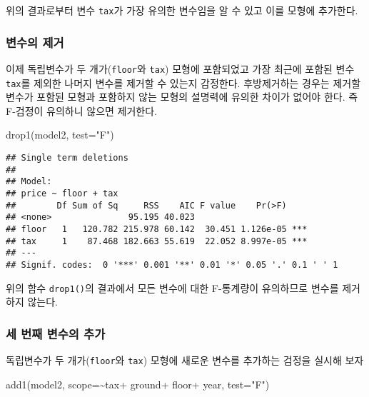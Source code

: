 \documentclass[
]{book}
\newenvironment{Shaded}{\begin{snugshade}}{\end{snugshade}}
\newcommand{\AttributeTok}[1]{\textcolor[rgb]{0.77,0.63,0.00}{#1}}
\newcommand{\FunctionTok}[1]{\textcolor[rgb]{0.00,0.00,0.00}{#1}}
\newcommand{\NormalTok}[1]{#1}
\newcommand{\SpecialCharTok}[1]{\textcolor[rgb]{0.00,0.00,0.00}{#1}}
\newcommand{\StringTok}[1]{\textcolor[rgb]{0.31,0.60,0.02}{#1}}
\begin{document}
위의 결과로부터 변수 \texttt{tax}가 가장 유의한 변수임을 알 수 있고 이를 모형에 추가한다.

\hypertarget{uxbcc0uxc218uxc758-uxc81cuxac70}{%
\subsubsection{변수의 제거}\label{uxbcc0uxc218uxc758-uxc81cuxac70}}

이제 독립변수가 두 개가(\texttt{floor}와 \texttt{tax}) 모형에 포함되었고 가장 최근에 포함된 변수 \texttt{tax}를 제외한
나머지 변수를 제거할 수 있는지 감정한다. 후방제거하는 경우는 제거할 변수가 포함된 모형과 포함하지 않는 모형의
설명력에 유의한 차이가 없어야 한다. 즉 F-검정이 유의하니 않으면 제거한다.

\begin{Shaded}
\begin{Highlighting}[]
\FunctionTok{drop1}\NormalTok{(model2, }\AttributeTok{test=}\StringTok{"F"}\NormalTok{)}
\end{Highlighting}
\end{Shaded}

\begin{verbatim}
## Single term deletions
## 
## Model:
## price ~ floor + tax
##        Df Sum of Sq     RSS    AIC F value    Pr(>F)    
## <none>               95.195 40.023                      
## floor   1   120.782 215.978 60.142  30.451 1.126e-05 ***
## tax     1    87.468 182.663 55.619  22.052 8.997e-05 ***
## ---
## Signif. codes:  0 '***' 0.001 '**' 0.01 '*' 0.05 '.' 0.1 ' ' 1
\end{verbatim}

위의 함수 \texttt{drop1()}의 결과에서 모든 변수에 대한 F-통계량이 유의하므로 변수를 제거하지 않는다.

\hypertarget{uxc138-uxbc88uxc9f8-uxbcc0uxc218uxc758-uxcd94uxac00}{%
\subsubsection{세 번째 변수의 추가}\label{uxc138-uxbc88uxc9f8-uxbcc0uxc218uxc758-uxcd94uxac00}}

독립변수가 두 개가(\texttt{floor}와 \texttt{tax}) 모형에 새로운 변수를 추가하는 검정을 실시해 보자

\begin{Shaded}
\begin{Highlighting}[]
\FunctionTok{add1}\NormalTok{(model2, }\AttributeTok{scope=}\SpecialCharTok{\textasciitilde{}}\NormalTok{tax}\SpecialCharTok{+}\NormalTok{ ground}\SpecialCharTok{+}\NormalTok{ floor}\SpecialCharTok{+}\NormalTok{ year, }\AttributeTok{test=}\StringTok{"F"}\NormalTok{)}
\end{Highlighting}
\end{Shaded}
\end{document}
